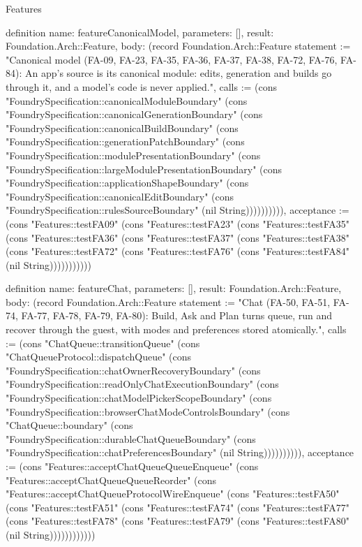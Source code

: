\begin{lexlean}{Features}
\begin{semanticmodule}
definition{
  name: featureCanonicalModel,
  parameters: [],
  result: Foundation.Arch::Feature,
  body: (record Foundation.Arch::Feature {statement := "Canonical model (FA-09, FA-23, FA-35, FA-36, FA-37, FA-38, FA-72, FA-76, FA-84): An app's source is its canonical module: edits, generation and builds go through it, and a model's code is never applied.", calls := (cons "FoundrySpecification::canonicalModuleBoundary" (cons "FoundrySpecification::canonicalGenerationBoundary" (cons "FoundrySpecification::canonicalBuildBoundary" (cons "FoundrySpecification::generationPatchBoundary" (cons "FoundrySpecification::modulePresentationBoundary" (cons "FoundrySpecification::largeModulePresentationBoundary" (cons "FoundrySpecification::applicationShapeBoundary" (cons "FoundrySpecification::canonicalEditBoundary" (cons "FoundrySpecification::rulesSourceBoundary" (nil String)))))))))), acceptance := (cons "Features::testFA09" (cons "Features::testFA23" (cons "Features::testFA35" (cons "Features::testFA36" (cons "Features::testFA37" (cons "Features::testFA38" (cons "Features::testFA72" (cons "Features::testFA76" (cons "Features::testFA84" (nil String))))))))))})
}

definition{
  name: featureChat,
  parameters: [],
  result: Foundation.Arch::Feature,
  body: (record Foundation.Arch::Feature {statement := "Chat (FA-50, FA-51, FA-74, FA-77, FA-78, FA-79, FA-80): Build, Ask and Plan turns queue, run and recover through the guest, with modes and preferences stored atomically.", calls := (cons "ChatQueue::transitionQueue" (cons "ChatQueueProtocol::dispatchQueue" (cons "FoundrySpecification::chatOwnerRecoveryBoundary" (cons "FoundrySpecification::readOnlyChatExecutionBoundary" (cons "FoundrySpecification::chatModelPickerScopeBoundary" (cons "FoundrySpecification::browserChatModeControlsBoundary" (cons "ChatQueue::boundary" (cons "FoundrySpecification::durableChatQueueBoundary" (cons "FoundrySpecification::chatPreferencesBoundary" (nil String)))))))))), acceptance := (cons "Features::acceptChatQueueQueueEnqueue" (cons "Features::acceptChatQueueQueueReorder" (cons "Features::acceptChatQueueProtocolWireEnqueue" (cons "Features::testFA50" (cons "Features::testFA51" (cons "Features::testFA74" (cons "Features::testFA77" (cons "Features::testFA78" (cons "Features::testFA79" (cons "Features::testFA80" (nil String)))))))))))})
}


\end{semanticmodule}
\end{lexlean}
